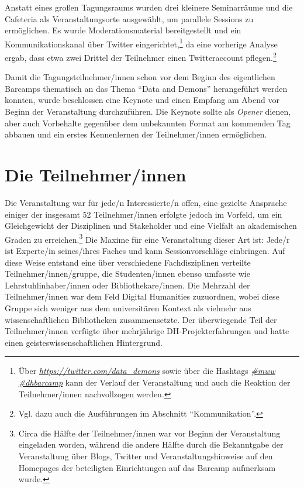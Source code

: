 \documentclass[a4paper,
fontsize=11pt,
oneside,
numbers=noperiodatend,
parskip=half-,
bibliography=totoc,
final
]{scrartcl}
\begin{document}
Anstatt eines großen Tagungsraums wurden drei kleinere Seminarräume und
die Cafeteria als Veranstaltungsorte ausgewählt, um parallele Sessions
zu ermöglichen. Es wurde Moderationsmaterial bereitgestellt und ein
Kommunikationskanal über Twitter eingerichtet,\footnote{Über
  \href{https://twitter.com/data_demons}{\emph{https://twitter.com/data\_demons}}
  sowie über die Hashtags
  \href{https://twitter.com/hashtag/mww?src=hash}{\emph{\#mww}}
  \href{https://twitter.com/hashtag/dhbarcamp?src=hash}{\emph{\#dhbarcamp}}
  kann der Verlauf der Veranstaltung und auch die Reaktion der
  Teilnehmer/innen nachvollzogen werden.} da eine vorherige Analyse
ergab, dass etwa zwei Drittel der Teilnehmer einen Twitteraccount
pflegen.\footnote{Vgl. dazu auch die Ausführungen im Abschnitt
  \enquote{Kommunikation}.}

Damit die Tagungsteilnehmer/innen schon vor dem Beginn des eigentlichen
Barcamps thematisch an das Thema \enquote{Data and Demons} herangeführt
werden konnten, wurde beschlossen eine Keynote und einen Empfang am
Abend vor Beginn der Veranstaltung durchzuführen. Die Keynote sollte als
\emph{Opener} dienen, aber auch Vorbehalte gegenüber dem unbekannten
Format am kommenden Tag abbauen und ein erstes Kennenlernen der
Teilnehmer/innen ermöglichen.

\section{Die Teilnehmer/innen}\label{die-teilnehmerinnen}

Die Veranstaltung war für jede/n Interessierte/n offen, eine gezielte
Ansprache einiger der insgesamt 52 Teilnehmer/innen erfolgte jedoch im
Vorfeld, um ein Gleichgewicht der Disziplinen und Stakeholder und eine
Vielfalt an akademischen Graden zu erreichen.\footnote{Circa die Hälfte
  der Teilnehmer/innen war vor Beginn der Veranstaltung eingeladen
  worden, während die andere Hälfte durch die Bekanntgabe der
  Veranstaltung über Blogs, Twitter und Veranstaltungshinweise auf den
  Homepages der beteiligten Einrichtungen auf das Barcamp aufmerksam
  wurde.} Die Maxime für eine Veranstaltung dieser Art ist: Jede/r ist
Experte/in seines/ihres Faches und kann Sessionvorschläge einbringen.
Auf diese Weise entstand eine über verschiedene Fachdisziplinen
verteilte Teilnehmer/innen/gruppe, die Studenten/innen ebenso umfasste
wie Lehrstuhlinhaber/innen oder Bibliothekare/innen. Die Mehrzahl der
Teilnehmer/innen war dem Feld Digital Humanities zuzuordnen, wobei diese
Gruppe sich weniger aus dem universitären Kontext als vielmehr aus
wissenschaftlichen Bibliotheken zusammensetzte. Der überwiegende Teil
der Teilnehmer/innen verfügte über mehrjährige DH-Projekterfahrungen und
hatte einen geisteswissenschaftlichen Hintergrund.
\end{document}
